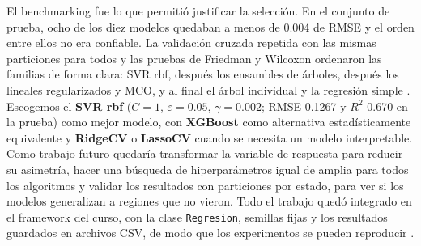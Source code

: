 \documentclass[11pt,a4paper]{article}
\let\citepOriginal\citep
\renewcommand*{\citep}[1]{\textbf{\citepOriginal{#1}}}%
\begin{document}
El benchmarking fue lo que permitió justificar la selección. En el conjunto de prueba, ocho de los diez modelos quedaban a menos de 0.004 de RMSE y el orden entre ellos no era confiable. La validación cruzada repetida con las mismas particiones para todos y las pruebas de Friedman y Wilcoxon ordenaron las familias de forma clara: SVR rbf, después los ensambles de árboles, después los lineales regularizados y MCO, y al final el árbol individual y la regresión simple \citep{demsar2006,hothorn2005}. Escogemos el \textbf{SVR rbf} ($C=1$, $\varepsilon=0.05$, $\gamma=0.002$; RMSE 0.1267 y $R^2$ 0.670 en la prueba) como mejor modelo, con \textbf{XGBoost} como alternativa estadísticamente equivalente y \textbf{RidgeCV} o \textbf{LassoCV} cuando se necesita un modelo interpretable. Como trabajo futuro quedaría transformar la variable de respuesta para reducir su asimetría, hacer una búsqueda de hiperparámetros igual de amplia para todos los algoritmos y validar los resultados con particiones por estado, para ver si los modelos generalizan a regiones que no vieron. Todo el trabajo quedó integrado en el framework del curso, con la clase \texttt{Regresion}, semillas fijas y los resultados guardados en archivos CSV, de modo que los experimentos se pueden reproducir \citep{pedregosa2011}.
\end{document}

